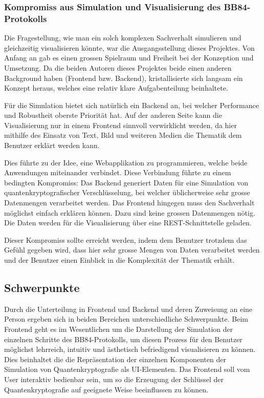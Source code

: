 \documentclass[a4paper,10.2pt,pdftex]{scrartcl}%
\begin{document}
\subsubsection{Kompromiss aus Simulation und Visualisierung des BB84-Protokolls}
Die Fragestellung, wie man ein solch komplexen Sachverhalt simulieren und gleichzeitig visualisieren könnte, war die Ausgangsstellung dieses Projektes. Von Anfang an gab es einen grossen Spielraum und Freiheit bei der Konzeption und Umsetzung. Da die beiden Autoren dieses Projektes beide einen anderen Background haben (Frontend bzw. Backend), kristallisierte sich langsam ein Konzept heraus, welches eine relativ klare Aufgabenteilung beinhaltete.

Für die Simulation bietet sich natürlich ein Backend an, bei welcher Performance und Robustheit oberste Priorität hat. Auf der anderen Seite kann die Visualisierung nur in einem Frontend sinnvoll verwirklicht werden, da hier mithilfe des Einsatz von Text, Bild und weiteren Medien die Thematik dem Benutzer erklärt werden kann.

Dies führte zu der Idee, eine Webapplikation zu programmieren, welche beide Anwendungen miteinander verbindet. Diese Verbindung führte zu einem bedingten Kompromiss: Das Backend generiert Daten für eine Simulation von quantenkryptografischer Verschlüsselung, bei welcher üblicherweise sehr grosse Datenmengen verarbeitet werden. Das Frontend hingegen muss den Sachverhalt möglichst einfach erklären können. Dazu sind keine grossen Datenmengen nötig. Die Daten werden für die Visualisierung über eine REST-Schnittstelle geladen. 

Dieser Kompromiss sollte erreicht werden, indem dem Benutzer trotzdem das Gefühl gegeben wird, dass hier sehr grosse Mengen von Daten verarbeitet werden und der Benutzer einen Einblick in die Komplexität der Thematik erhält. 
 



\subsection{Schwerpunkte}
Durch die Unterteilung in Frontend und Backend und deren Zuweisung an eine Person ergeben sich in beiden Bereichen unterschiedliche Schwerpunkte. Beim Frontend geht es im Wesentlichen um die Darstellung der Simulation der einzelnen Schritte des BB84-Protokolls, um diesen Prozess für den Benutzer möglichst lehrreich, intuitiv und ästhetisch befriedigend visualisieren zu können. Dies beinhaltet die die Repräsentation der einzelnen Komponenten der Simulation von Quantenkryptografie als UI-Elementen. Das Frontend soll vom User interaktiv bedienbar sein, um so die Erzeugung der Schlüssel der Quantenkryptografie auf geeignete Weise beeinflussen zu können.
\end{document}
